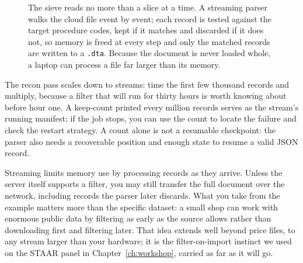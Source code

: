 \documentclass[
    a4paper,
    fontsize=10pt,
    twoside=true,
    numbers=noenddot,
]{kaobook}
\begin{document}
\begin{figure}[htbp]
\centering
{}
\caption[The streaming sieve]{The sieve reads no more than a slice at a time.
A streaming parser walks the cloud file event by event; each record is
tested against the target procedure codes, kept if it matches and
discarded if it does not, so memory is freed at every step and only the
matched records are written to a \texttt{.dta}. Because the document is
never loaded whole, a laptop can process a file far larger than its
memory.}
\label{fig:ch04-viz-sieve}
\end{figure}

The recon pass scales down to streams: time the first few thousand records and multiply, because a filter that will run for thirty hours is worth knowing about before hour one. A keep-count printed every million records serves as the stream's running manifest; if the job stops, you can use the count to locate the failure and check the restart strategy. A count alone is not a resumable checkpoint: the parser also needs a recoverable position and enough state to resume a valid JSON record.

Streaming limits memory use by processing records as they arrive. Unless the server itself supports a filter, you may still transfer the full document over the network, including records the parser later discards. What you take from the example matters more than the specific dataset: a small shop can work with enormous public data by filtering as early as the source allows rather than downloading first and filtering later. That idea extends well beyond price files, to any stream larger than your hardware; it is the filter-on-import instinct we used on the STAAR panel in Chapter~\ref{ch:workshop}, carried as far as it will go.
\end{document}
